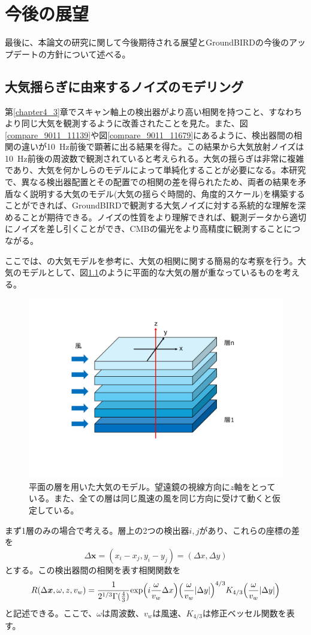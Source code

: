 \chapter{今後の展望}
\label{chapter5}
最後に、本論文の研究に関して今後期待される展望とGroundBIRDの今後のアップデートの方針について述べる。
\section{大気揺らぎに由来するノイズのモデリング}
\label{atmos_model}
第\ref{chapter4_3}章でスキャン軸上の検出器がより高い相関を持つこと、すなわちより同じ大気を観測するように改善されたことを見た。また、図\ref{compare_9011_11139}や図\ref{compare_9011_11679}にあるように、検出器間の相関の違いが\SI{10}{Hz}前後で顕著に出る結果を得た。この結果から大気放射ノイズは\SI{10}{Hz}前後の周波数で観測されていると考えられる。大気の揺らぎは非常に複雑であり、大気を何かしらのモデルによって単純化することが必要になる。本研究で、異なる検出器配置とその配置での相関の差を得られたため、両者の結果を矛盾なく説明する大気のモデル(大気の揺らぐ時間的、角度的スケール)を構築することができれば、GroundBIRDで観測する大気ノイズに対する系統的な理解を深めることが期待できる。ノイズの性質をより理解できれば、観測データから適切にノイズを差し引くことができ、CMBの偏光をより高精度に観測することにつながる。

ここでは、\cite{nishinomiya}の大気モデルを参考に、大気の相関に関する簡易的な考察を行う。大気のモデルとして、図\ref{atmos_layer}のように平面的な大気の層が重なっているものを考える。

\begin{figure}[htbp]
  \centering
  \includegraphics[width=0.7\columnwidth]{6_prospect/figs/atmos_layer.pdf}
  \caption{平面の層を用いた大気のモデル。望遠鏡の視線方向に$z$軸をとっている。また、全ての層は同じ風速の風を同じ方向に受けて動くと仮定している。}
  \label{atmos_layer}
\end{figure}
まず1層のみの場合で考える。層上の2つの検出器$i, j$があり、これらの座標の差を
\begin{equation}
  \Delta\bm{x} = (x_{i} -x_{j}, y_{i} - y_{j}) = (\Delta x, \Delta y)
\end{equation}
とする。この検出器間の相関を表す相関関数を
\begin{equation}
  R(\Delta\bm{x},\omega,z, v_{w}) = \frac{1}{2^{1/3}\Gamma(\frac{4}{3})}\mathrm{exp}\Bigl(i\frac{\omega}{v_{w}}\Delta x\Bigr)\Bigl(\frac{\omega}{v_{w}}|\Delta y|\Bigr)^{4/3}K_{4/3}\Bigl(\frac{\omega}{v_{w}}|\Delta y|\Bigr)
\end{equation}
と記述できる。ここで、$\omega$は周波数、$v_{w}$は風速、$K_{4/3}$は修正ベッセル関数を表す。

